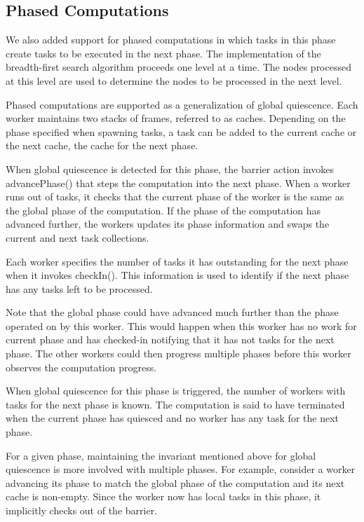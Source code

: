 \subsection{Phased Computations}

We also added support for phased computations in which tasks in this
phase create tasks to be executed in the next phase. The
implementation of the breadth-first search algorithm proceeds one
level at a time. The nodes processed at this level are used to
determine the nodes to be processed in the next level.

Phased computations are supported as a generalization of global
quiescence. Each worker maintains two stacks of frames, referred to as
caches. Depending on the phase specified when spawning tasks, a task
can be added to the current cache or the next cache, the cache for the
next phase. 

When global quiescence is detected for this phase, the barrier action
invokes {\java advancePhase()} that steps the computation into the
next phase. When a worker runs out of tasks, it checks that the
current phase of the worker is the same as the global phase of the
computation. If the phase of the computation has advanced further, the
workers updates its phase information and swaps the current and next
task collections. 

Each worker specifies the number of tasks it has
outstanding for the next phase when it invokes {\java
  checkIn()}. This information is used to identify if the next phase
has any tasks left to be processed. 

Note that the global phase could have advanced much further than the
phase operated on by this worker. This would happen when this worker
has no work for current phase and has checked-in notifying that it has
not tasks for the next phase. The other workers could then progress
multiple phases before this worker observes the computation progress. 

When global quiescence for this phase is triggered, the number of
workers with tasks for the next phase is known. The computation is
said to have terminated when the current phase has quiesced and no
worker has any task for the next phase. 

For a given phase, maintaining the invariant mentioned above for
global quiescence is more involved with multiple phases. For example,
consider a worker advancing its phase to match the global phase of the
computation and its next cache is non-empty. Since the worker now has
local tasks in this phase, it implicitly checks out of the barrier.


